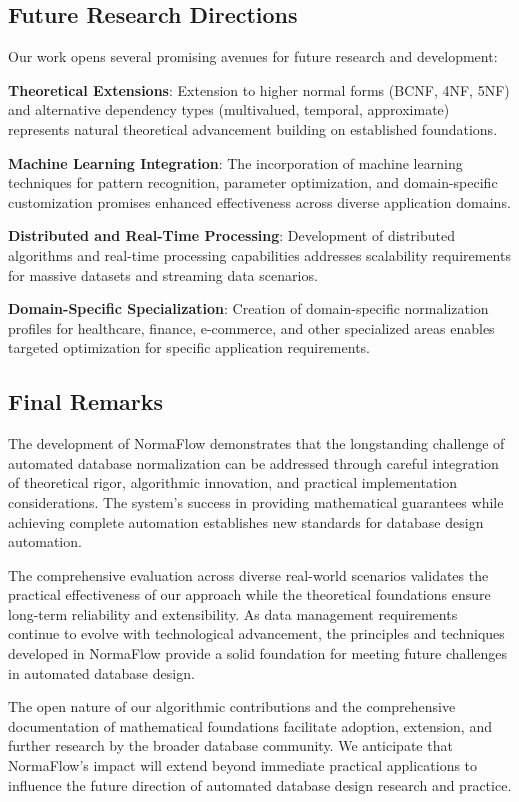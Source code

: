 \documentclass[acmsmall]{acmart}
\begin{document}
\subsection{Future Research Directions}

Our work opens several promising avenues for future research and development:

\textbf{Theoretical Extensions}: Extension to higher normal forms (BCNF, 4NF, 5NF) and alternative dependency types (multivalued, temporal, approximate) represents natural theoretical advancement building on established foundations.

\textbf{Machine Learning Integration}: The incorporation of machine learning techniques for pattern recognition, parameter optimization, and domain-specific customization promises enhanced effectiveness across diverse application domains.

\textbf{Distributed and Real-Time Processing}: Development of distributed algorithms and real-time processing capabilities addresses scalability requirements for massive datasets and streaming data scenarios.

\textbf{Domain-Specific Specialization}: Creation of domain-specific normalization profiles for healthcare, finance, e-commerce, and other specialized areas enables targeted optimization for specific application requirements.

\subsection{Final Remarks}

The development of NormaFlow demonstrates that the longstanding challenge of automated database normalization can be addressed through careful integration of theoretical rigor, algorithmic innovation, and practical implementation considerations. The system's success in providing mathematical guarantees while achieving complete automation establishes new standards for database design automation.

The comprehensive evaluation across diverse real-world scenarios validates the practical effectiveness of our approach while the theoretical foundations ensure long-term reliability and extensibility. As data management requirements continue to evolve with technological advancement, the principles and techniques developed in NormaFlow provide a solid foundation for meeting future challenges in automated database design.

The open nature of our algorithmic contributions and the comprehensive documentation of mathematical foundations facilitate adoption, extension, and further research by the broader database community. We anticipate that NormaFlow's impact will extend beyond immediate practical applications to influence the future direction of automated database design research and practice.
\end{document}
